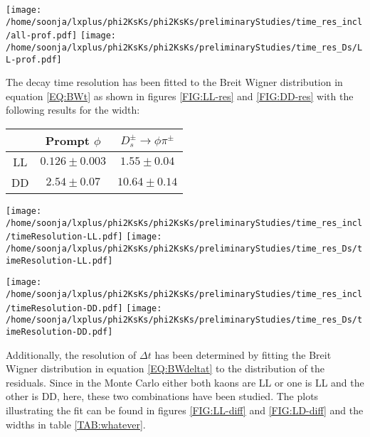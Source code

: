 \begin{center}
\texttt{[image: /home/soonja/lxplus/phi2KsKs/phi2KsKs/preliminaryStudies/time\_res\_incl/all-prof.pdf]}
\texttt{[image: /home/soonja/lxplus/phi2KsKs/phi2KsKs/preliminaryStudies/time\_res\_Ds/LL-prof.pdf]}
\label{FIG:all-prof}
\end{center}
The decay time resolution has been fitted to the Breit Wigner distribution in equation \eqref{EQ:BWt} as shown in figures \ref{FIG:LL-res} and \ref{FIG:DD-res} with the following results for the width:

\begin{center}
\begin{tabular}{c|cc}
& Prompt $\phi$ & $D_s^\pm\rightarrow \phi \pi^\pm$ \\ 
\hline 
LL& $0.126 \pm 0.003$ & $1.55 \pm 0.04$ \\ 
DD& $2.54 \pm 0.07$ & $10.64 \pm 0.14$ \\ 
\end{tabular} 
\end{center}

\begin{center}
\texttt{[image: /home/soonja/lxplus/phi2KsKs/phi2KsKs/preliminaryStudies/time\_res\_incl/timeResolution-LL.pdf]}
\texttt{[image: /home/soonja/lxplus/phi2KsKs/phi2KsKs/preliminaryStudies/time\_res\_Ds/timeResolution-LL.pdf]}
\label{FIG:LL-res}


\texttt{[image: /home/soonja/lxplus/phi2KsKs/phi2KsKs/preliminaryStudies/time\_res\_incl/timeResolution-DD.pdf]}
\texttt{[image: /home/soonja/lxplus/phi2KsKs/phi2KsKs/preliminaryStudies/time\_res\_Ds/timeResolution-DD.pdf]}
\label{FIG:DD-res}
\end{center}

Additionally, the resolution of $\Delta t$ has been determined by fitting the Breit Wigner distribution in equation \eqref{EQ:BWdeltat} to the distribution of the residuals. Since in the Monte Carlo either both kaons are LL or one is LL and the other is DD, here, these two combinations have been studied. The plots illustrating the fit can be found in figures \ref{FIG:LL-diff} and \ref{FIG:LD-diff} and the widths in table \ref{TAB:whatever}.




